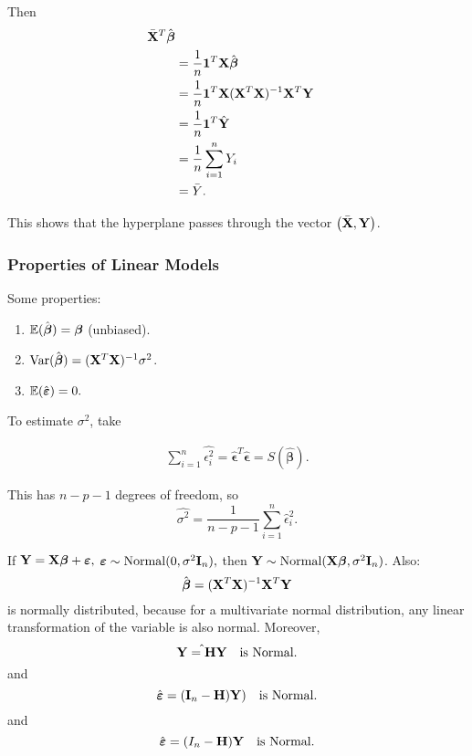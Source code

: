 \begin{remark}
Then 
\begin{align*}
	\bar{\mathbf X}^T\hat{{\boldsymbol{\beta}}} \\
	&= \frac{1}{n} \mathbf 1^T\mathbf X \hat{{\boldsymbol{\beta}}}\\
	&= \frac{1}{n}\mathbf 1^T\mathbf X (\mathbf X^T\mathbf X)^{-1}\mathbf X^T\mathbf Y  \\
	&= \frac{1}{n} \mathbf 1^T \hat{\mathbf Y} \\
	&= \frac{1}{n}\sum^{n}_{i=1} Y_i \\
	&=\bar{Y}
.\end{align*}

This shows that the hyperplane passes through the vector $\left(\bar{\mathbf X}, \mathbf Y \right) $.

\end{remark}

\subsubsection{Properties of Linear Models}
Some properties:
\begin{enumerate}
	\item $\mathbb E(\hat{\boldsymbol{\beta}})=\boldsymbol \beta$ (unbiased).
	\item $\operatorname*{Var}(\hat{\boldsymbol\beta})=(\mathbf X^T\mathbf X)^{-1}\sigma^2$.
	\item $\mathbb E(\hat{\boldsymbol {\varepsilon}})=0.$
\end{enumerate}

To estimate $\sigma^2$, take

\begin{align*}
	\sum^n_{i=1}\hat{\epsilon_i^2} = \hat{\boldsymbol \epsilon}^T \hat{\boldsymbol \epsilon}=S(\hat{\boldsymbol \beta}) 
.\end{align*}

This has $n-p-1$ degrees of freedom, so
\[
	\hat{\sigma^2} = \frac{1}{n-p-1} \sum^n_{i=1}\hat{\epsilon}_i^2
.\] 
\begin{eg}
If $\mathbf Y=\mathbf X\boldsymbol {{\boldsymbol{\beta}}}+\boldsymbol {\varepsilon},$ $\boldsymbol {\varepsilon} \sim \operatorname*{Normal}(0,\sigma^2\mathbf I_n),$ then $\mathbf Y\sim\operatorname*{Normal}(\mathbf X{\boldsymbol{\beta}},\sigma^2\mathbf I_n)$. Also:
\[
	\hat{{\boldsymbol{\beta}}}=(\mathbf X^T\mathbf X)^{-1}\mathbf X^T\mathbf Y
\] 
is normally distributed, because for a multivariate normal distribution, any linear transformation of the variable is also normal. Moreover,
\[
\hat{\mathbf Y=\mathbf{H}\mathbf Y} \quad \text{is Normal}
.\] 
and 
\[
\hat{\boldsymbol {\varepsilon}} =(\mathbf I_n-\mathbf{H})\mathbf Y) \quad \text{is Normal}
.\] 
and
\[
\hat{{\boldsymbol{\varepsilon}}} = (I_n-\mathbf H)\mathbf Y \quad \text{is Normal}
.\] 
\end{eg}


